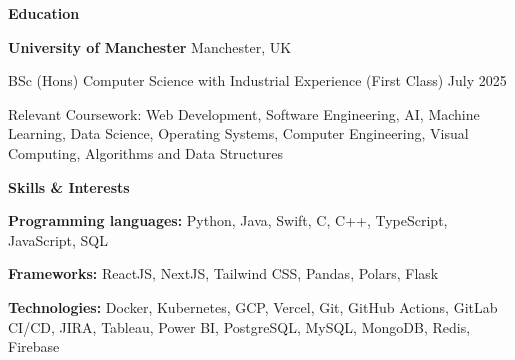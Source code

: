 \documentclass[11pt]{article}
\begin{document}
\vspace{4pt}

\begin{center}
    \textbf{Education}
\end{center}
\textbf{University of Manchester} \hfill Manchester, UK

BSc (Hons) Computer Science with Industrial Experience (First Class) \hfill July 2025

Relevant Coursework: Web Development, Software Engineering, AI, Machine Learning, Data Science, Operating Systems, Computer Engineering, Visual Computing, Algorithms and Data Structures

\vspace{4pt}

\begin{center}
    \textbf{Skills \& Interests}
\end{center}

\textbf{Programming languages:} Python, Java, Swift, C, C++, TypeScript, JavaScript, SQL

\textbf{Frameworks:} ReactJS, NextJS, Tailwind CSS, Pandas, Polars, Flask

\textbf{Technologies:} Docker, Kubernetes, GCP, Vercel, Git, GitHub Actions, GitLab CI/CD, JIRA, Tableau, Power BI, PostgreSQL, MySQL, MongoDB, Redis, Firebase
\end{document}
